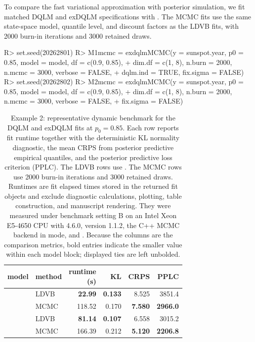\documentclass{jss}
\newcommand{\tworowcell}[1]{\smash{\raisebox{-0.5\normalbaselineskip}{#1}}}
\newcommand{\TableStyle}{\footnotesize\setlength{\tabcolsep}{4pt}\renewcommand{\arraystretch}{1.08}}
\begin{document}
To compare the fast variational approximation with posterior simulation, we fit matched DQLM and exDQLM specifications with . The MCMC fits use the same state-space model, quantile level, and discount factors as the LDVB fits, with 2000 burn-in iterations and 3000 retained draws.

\begin{CodeChunk}
\begin{CodeInput}
R> set.seed(20262801)
R> M1mcmc = exdqlmMCMC(y = sunspot.year, p0 = 0.85, model = model, df = c(0.9, 0.85),
+                dim.df = c(1, 8), n.burn = 2000, n.mcmc = 3000, verbose = FALSE,
+                dqlm.ind = TRUE, fix.sigma = FALSE)
R> set.seed(20262802)
R> M2mcmc = exdqlmMCMC(y = sunspot.year, p0 = 0.85, model = model, df = c(0.9, 0.85),
+                dim.df = c(1, 8), n.burn = 2000, n.mcmc = 3000, verbose = FALSE,
+                fix.sigma = FALSE)
\end{CodeInput}
\end{CodeChunk}

\begin{table}[t!]
\centering
\TableStyle
\begin{tabular}{@{}llrrrr@{}}
 \toprule
 model & method & \shortstack{runtime\\(s)} & KL & CRPS & PPLC \\
 \midrule
 \tworowcell{DQLM} & LDVB & \textbf{22.99} & \textbf{0.133} & 8.525 & 3851.4 \\
 & MCMC & 118.52 & 0.170 & \textbf{7.580} & \textbf{2966.0} \\
 \midrule   
 \tworowcell{exDQLM} & LDVB & \textbf{81.14} & \textbf{0.107} & 6.558 & 3015.2 \\
 & MCMC & 166.39 & 0.212 & \textbf{5.120} & \textbf{2206.8} \\
 \bottomrule   
\end{tabular}
\caption{Example 2: representative dynamic benchmark for the DQLM and exDQLM fits at \(p_0 = 0.85\). Each row reports fit runtime together with the deterministic KL normality diagnostic, the mean CRPS from posterior predictive empirical quantiles, and the posterior predictive loss criterion (PPLC). The LDVB rows use . The MCMC rows use 2000 burn-in iterations and 3000 retained draws. Runtimes are fit elapsed times stored in the returned fit objects and exclude diagnostic calculations, plotting, table construction, and manuscript rendering. They were measured under benchmark setting B on an Intel Xeon E5-4650 CPU with  4.6.0,  version 1.1.2, the C++ MCMC backend in  mode, and . Because the columns are the comparison metrics, bold entries indicate the smaller value within each model block; displayed ties are left unbolded.}
\label{tab:ex2bench}
\end{table}
\end{document}
